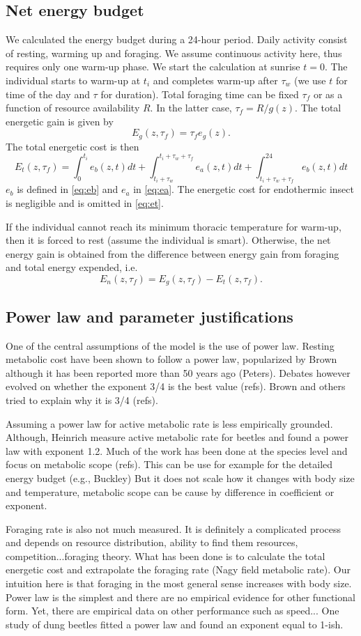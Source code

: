 \subsection*{Net energy budget}
We calculated  the energy budget during a 24-hour period.
Daily activity consist of resting, warming up and foraging.
We assume continuous activity here, thus requires only one warm-up phase.
We start the calculation at sunrise $t = 0$.
The individual starts to warm-up at $t_i$ and completes warm-up after $\tau_w$ (we use $t$ for time of the day and $\tau$ for duration).
Total foraging time can be fixed $\tau_f$ or as a function of resource availability $R$. 
In the latter case, $\tau_f = R/g(z)$.
The total energetic gain is given by
\[
	E_g(z,\tau_f) = \tau_f e_g(z).
\]
%
The total energetic cost is then
\begin{equation} \label{eq:et}
	E_t(z, \tau_f) = \int_0^{t_i} e_b(z, t) dt + \int_{t_i + \tau_w}^{t_i +\tau_w + \tau_f} e_a(z,t) dt + \int_{t_i+\tau_w+\tau_f}^{24} e_b(z, t) dt 
\end{equation}
$e_b$ is defined in \cref{eq:eb}  and $e_a$ in \cref{eq:ea}.
The energetic cost for endothermic insect is negligible and is omitted in \cref{eq:et}.

If the individual cannot reach its minimum thoracic temperature for warm-up, then it is forced to rest (assume the individual is smart).
Otherwise, the net energy gain is obtained from the  difference between energy gain from foraging and total energy expended, i.e.
\[ 
	E_n(z, \tau_f) = E_g(z,\tau_f) - E_t(z, \tau_f).
\]

\subsection*{Power law and parameter justifications}
One of the central assumptions of the model is the use of power law.
Resting metabolic cost have been shown to follow a power law, popularized by Brown although it has been reported more than 50 years ago (Peters).
Debates however evolved on whether the exponent 3/4 is the best value (refs).
Brown and others tried to explain why it is 3/4 (refs).

Assuming a power law for active metabolic rate is less empirically grounded.
Although, Heinrich measure active metabolic rate for beetles and found a power law with exponent 1.2.
Much of the work has been done at the  species level and focus on metabolic scope (refs).
This can be use for example for the detailed energy budget (e.g., Buckley)
But it does not scale how it changes with body size and temperature, metabolic scope can be cause by difference in coefficient or exponent.

Foraging rate is also not much measured.
It is definitely a complicated process and depends on resource distribution, ability to find them resources, competition...foraging theory.
What has been done is to calculate the total energetic cost and extrapolate the foraging rate (Nagy field metabolic rate).
Our intuition here is that foraging in the most general sense increases with body size.
Power law is the simplest and there are no empirical evidence for other functional form.
Yet, there are empirical data on other performance such as speed...
One study of dung beetles fitted a power law and found an exponent equal to 1-ish.